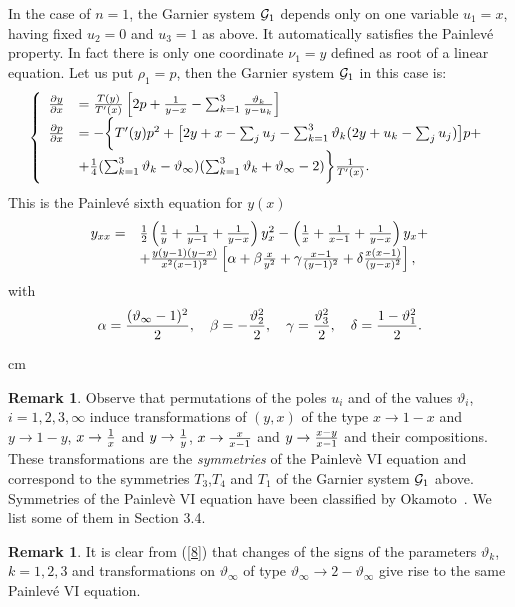\documentclass[12pt]{article}
\def\thi{{\vartheta_\infty}}
\theoremstyle{definition}
\newtheorem{rmk}[df]{Remark}
\theoremstyle{theorem}
\begin{document}
In the case of $n=1$, the Garnier system ${\cal G}_1$ depends only on
one variable $u_1=x$, having fixed $u_2=0$ and $u_3=1$ as above. It
automatically satisfies the Painlev\'e property. In fact there is 
only one coordinate $\nu_1=y$ defined as root of a linear equation.
Let us put $\rho_1=p$, then the Garnier system ${\cal G}_1$ in 
this case is:
$$
\left\{
\begin{array}{ll}
{\partial  y\over\partial x} &=
{T( y)\over T'(x)}\left[2 p + {1\over  y-x}-
\sum_{k=1}^3{\vartheta_k\over y-u_k}\right]\\
{\partial p\over\partial x} &=-\bigg\{
T'( y) p^2 +
\big[2 y+x-\sum_ju_j-\sum_{k=1}^3
\vartheta_k(2 y+u_k-\sum_ju_j)\big]p+\\
&+{1\over4}(\sum_{k=1}^3\vartheta_k-\thi)
(\sum_{k=1}^3\vartheta_k+\thi-2)\bigg\}
{1\over T'(x)}.\\
\end{array}\right.
$$
This is the Painlev\'e sixth equation for $y(x)$ 
$$
\begin{array}{ll}
y_{xx}=&{1\over2}\left({1\over y}+{1\over y-1}+{1\over y-x}\right) y_x^2 -
\left({1\over x}+{1\over x-1}+{1\over y-x}\right)y_x+\\
&+{y(y-1)(y-x)\over x^2(x-1)^2}\left[\alpha+\beta {x\over y^2}+
\gamma{x-1\over(y-1)^2}+\delta {x(x-1)\over(y-x)^2}\right],\\
\end{array}
$$
with 
\begin{equation}
\alpha={(\thi-1)^2\over2},\quad\beta=-{\vartheta_2^2\over2},
\quad\gamma={\vartheta_3^2\over2},\quad\delta={1-\vartheta_1^2\over2}.
\label{8}\end{equation}

 cm
\begin{rmk} Observe that permutations of the poles $u_i$ 
and of the values $\vartheta_i$, $i=1,2,3,\infty$
induce transformations of $(y,x)$ of the type $x\to1-x$ and $y\to1-y$, 
$x\to{1\over x}$ and $y\to{1\over y}$, $x\to{x\over x-1}$ and
$y\to{x-y\over x-1}$ and their compositions. These
transformations are the {\it symmetries}\/ of the Painlev\`e VI
equation and correspond to the symmetries $T_3$,$T_4$ and $T_1$
of the Garnier system ${\cal G}_1$ above. Symmetries of the 
Painlev\`e VI equation have been classified by Okamoto~\cite{Ok2}. 
We list some of them in Section 3.4.  
\label{rmk0.0}\end{rmk}

\begin{rmk}
It is clear from (\ref{8}) that
changes of the signs of the parameters $\vartheta_k$, $k=1,2,3$ and
transformations on $\thi$ of type $\thi\to2-\thi$ give rise to the same
Painlev\'e VI equation.
\label{rmk0}\end{rmk}
\end{document}
